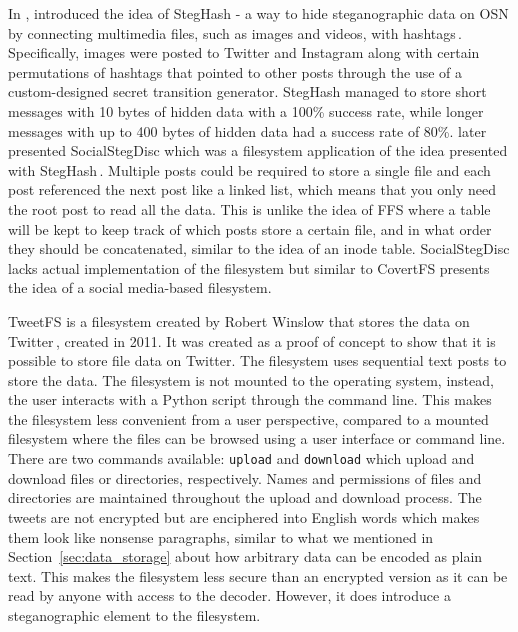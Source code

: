 In \citeyear{szczypiorskiStegHashNewMethod2016}, \citeauthor{szczypiorskiStegHashNewMethod2016} introduced the idea of StegHash - a way to hide steganographic data on \gls{OSN} by connecting multimedia files, such as images and videos, with hashtags\,\cite{szczypiorskiStegHashNewMethod2016}. Specifically, images were posted to Twitter and Instagram along with certain permutations of hashtags that pointed to other posts through the use of a \mbox{custom-designed} secret transition generator. StegHash managed to store short messages with 10 bytes of hidden data with a 100\% success rate, while longer messages with up to 400 bytes of hidden data had a success rate of 80\%. \citeauthor{bieniaszSocialStegDiscApplicationSteganography2017} later presented SocialStegDisc which was a filesystem application of the idea presented with StegHash\,\cite{bieniaszSocialStegDiscApplicationSteganography2017}. Multiple posts could be required to store a single file and each post referenced the next post like a linked list, which means that you only need the root post to read all the data. This is unlike the idea of \gls{FFS} where a table will be kept to keep track of which posts store a certain file, and in what order they should be concatenated, similar to the idea of an inode table. SocialStegDisc lacks actual implementation of the filesystem but similar to CovertFS presents the idea of a social \mbox{media-based} filesystem.

TweetFS is a filesystem created by Robert Winslow that stores the data on Twitter\,\cite{winslowTweetfsTweetfsMaster}, created in 2011. It was created as a proof of concept to show that it is possible to store file data on Twitter. The filesystem uses sequential text posts to store the data. The filesystem is not mounted to the operating system, instead, the user interacts with a Python script  through the command line. This makes the filesystem less convenient from a user perspective, compared to a mounted filesystem where the files can be browsed using a user interface or command line. There are two commands available: \texttt{upload} and \texttt{download} which upload and download files or directories, respectively. Names and permissions of files and directories are maintained throughout the upload and download process. The tweets are not encrypted but are enciphered into English words which makes them look like nonsense paragraphs, similar to what we mentioned in Section~\ref{sec:data_storage} about how arbitrary data can be encoded as plain text. This makes the filesystem less secure than an encrypted version as it can be read by anyone with access to the decoder. However, it does introduce a steganographic element to the filesystem.

